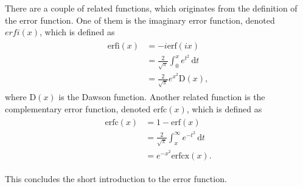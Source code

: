 \documentclass[twocolumn]{article}
\newcommand\erf{\ensuremath{\mathrm{erf}}\xspace}
\newcommand\erfi{\ensuremath{\mathrm{erfi}}\xspace}
\newcommand\erfc{\ensuremath{\mathrm{erfc}}\xspace}
\newcommand\dx[1]{\,\text{d}#1}
\begin{document}
There are a couple of related functions, which originates from the definition of the error function. One of them is the imaginary error function, denoted $erfi(x)$, which is defined as 
\begin{align}
\begin{split}
	\erfi (x)	&= -i \erf (ix) \\
				&= \frac{2}{\sqrt{\pi}} \int_0^x e^{t^2} \dx{t} \\
				&= \frac{2}{\sqrt{\pi}} e^{x^2} \mathrm{D}(x),
	\label{eq:iferr}
\end{split}
\end{align}
where $\mathrm{D}(x)$ is the Dawson function. Another related function is the complementary error function, denoted $\erfc(x)$, which is defined as
\begin{align}
\begin{split}
	\erfc(x)	&= 1 - \erf(x)\\
				&= \frac{2}{\sqrt{\pi}} \int_x^{\infty} e^{-t^2} \dx{t} \\
				&= e^{-x^2}\erfc\mathrm{x}(x).
	\label{eq:cferr}
\end{split}
\end{align}

This concludes the short introduction to the error function.

\printbibliography
\end{document}
